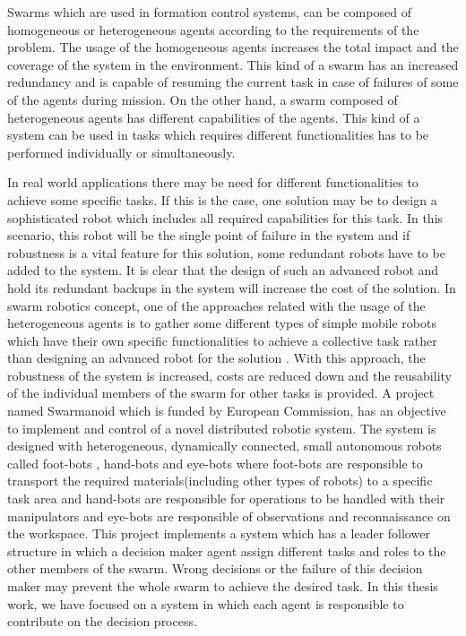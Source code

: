 Swarms which are used in formation control systems, can be composed of homogeneous or heterogeneous agents according to the requirements of the problem. The usage of the homogeneous agents increases the total impact and the coverage of the system in the environment. This kind of a swarm has an increased redundancy and is capable of resuming the current task in case of failures of some of the agents during mission. On the other hand, a swarm composed of heterogeneous agents has different capabilities of the agents. This kind of a system can be used in tasks which requires different functionalities has to be performed individually or simultaneously.

In real world applications there may be need for different  functionalities to achieve some specific tasks. If this is the case, one solution may be to design a sophisticated robot which includes all required capabilities for this task. In this scenario, this robot will be the single point of failure in the system and if robustness is a  vital feature for this solution, some redundant robots have to be added to the system. It is clear that the design of such an advanced robot and hold its redundant backups in the system will increase the cost of the solution. In swarm robotics concept, one of the approaches related with the usage of the heterogeneous agents is to gather some different types of simple mobile robots which have their own specific functionalities to achieve a collective task rather than designing an advanced robot for the solution \cite{99}. With this approach, the robustness of the system is increased, costs are reduced down and the reusability of the individual members of the swarm for other tasks is provided.  A project named Swarmanoid which is funded by European Commission, has an objective to implement and control of a novel distributed robotic system. The system is designed with heterogeneous, dynamically connected, small autonomous robots called foot-bots , hand-bots and eye-bots where foot-bots are responsible to transport the required materials(including other types of robots) to a specific task area and hand-bots are responsible for operations to be handled with their manipulators and eye-bots are responsible of observations and reconnaissance on the workspace. This project implements a system which has a leader follower structure in which a decision maker agent assign different tasks and roles to the other members of the swarm. Wrong decisions or the failure of this decision maker may prevent the whole swarm to achieve the desired task. In this thesis work, we have focused on a system in which each agent is responsible to contribute on the decision process.

